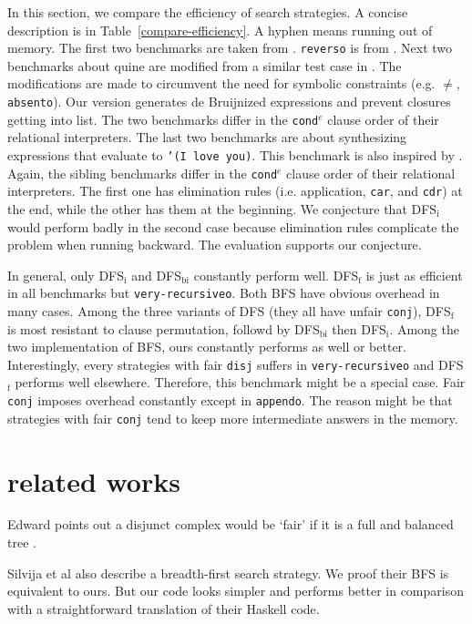 \documentclass[format=acmlarge, review=true, authordraft=true]{acmart}
\newcommand{\conde}{\texttt{cond$^e$}}
\newcommand{\conj}{\texttt{conj}}
\newcommand{\disj}{\texttt{disj}}
\begin{document}
In this section, we compare the efficiency of search strategies. A concise 
description is in Table~\ref{compare-efficiency}. A hyphen means running out of 
memory. The first two benchmarks are taken from 
\citet{friedman_reasoned_2018}. \texttt{reverso} is from 
\citet{rozplokhas2018improving}. Next two benchmarks 
about quine are modified from a similar test case in \citet{byrd2017unified}. 
The modifications are made 
to circumvent the need for symbolic constraints (e.g. $\neq$, 
\texttt{absento}). Our version generates de 
Bruijnized expressions and prevent closures getting into list. The two 
benchmarks differ in the \conde{} clause order of their relational 
interpreters. 
The last two 
benchmarks are about synthesizing expressions that evaluate to \texttt{'(I love 
you)}. This benchmark is also inspired by \citet{byrd2017unified}. Again, the 
sibling benchmarks differ in the \conde{} clause order of their relational 
interpreters. The first one 
has elimination rules (i.e. application, \texttt{car}, and \texttt{cdr}) at the 
end, while the other has them at the beginning. We conjecture that DFS$_\textrm{i}$ would 
perform badly in the second case because elimination rules complicate the 
problem when running backward. The evaluation supports our conjecture.

In general, only DFS$_\textrm{i}$ and DFS$_\textrm{bi}$ constantly perform well. DFS$_\textrm{f}$ is just as 
efficient in all benchmarks but \texttt{very-recursiveo}. Both BFS have obvious 
overhead in many cases. Among the three variants of DFS (they all have unfair 
\conj{}), DFS$_\textrm{f}$ is most resistant to clause permutation, followd by DFS$_\textrm{bi}$ then 
DFS$_\textrm{i}$. Among the two implementation of BFS, ours constantly performs as well or 
better. Interestingly, every strategies with fair \disj{} suffers in 
\texttt{very-recursiveo} and DFS$_\textrm{f}$ performs well elsewhere. 
Therefore, this 
benchmark might be a special case. Fair \conj{} imposes overhead constantly 
except in \texttt{appendo}. The reason might be that strategies with fair 
\conj{} tend to keep more intermediate answers in the memory.

\section{related works}

Edward points out a disjunct complex would be `fair' if it is a full and 
balanced tree \citet{yang2010adventures}.

Silvija et al \citet{seres1999algebra} also describe a breadth-first search 
strategy. We proof their BFS is equivalent to ours. But our code looks simpler 
and performs better in comparison with a straightforward translation of their 
Haskell code.
\end{document}
